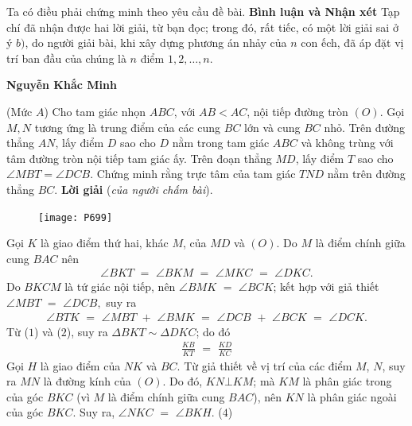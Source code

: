 \begin{multicols}{2}
	Ta có điều phải chứng minh theo yêu cầu đề bài.
	\vskip 0.05cm
	\textbf{Bình luận và Nhận xét}
	\vskip 0.05cm
	Tạp chí đã nhận được hai lời giải, từ bạn đọc; trong đó, rất tiếc, có một lời giải sai ở ý $b)$, do người giải bài, khi xây dựng phương án nhảy của $n$ con ếch, đã áp đặt vị trí ban đầu của chúng là $n$ điểm $1, 2, \ldots, n$.
	\begin{flushright}
		\textbf{Nguyễn Khắc Minh}
	\end{flushright}
	{}
	(Mức $A$) Cho tam giác nhọn $ABC$, với $AB<AC$, nội tiếp đường tròn $(O)$. Gọi $M,N$ tương ứng là trung điểm của các cung $BC$ lớn và cung $BC$ nhỏ. Trên đường thẳng $AN$, lấy điểm $D$ sao cho $D$ nằm trong tam giác $ABC$ và không trùng với tâm đường tròn nội tiếp tam giác ấy. Trên đoạn thẳng $MD$, lấy điểm $T$ sao cho $\angle{MBT}=\angle{DCB}$. Chứng minh rằng trực tâm của tam giác $TND$ nằm trên đường thẳng $BC$.
	\vskip 0.05cm
	\textbf{Lời giải} (\textit{của người chấm bài}).
	\begin{figure}[H]
		\vspace*{-5pt}
		\centering
		\captionsetup{labelformat= empty, justification=centering}
		\texttt{[image: P699]}
		\vspace*{-10pt}
	\end{figure}
	Gọi $K$ là giao điểm thứ hai, khác $M$, của $MD$ và $(O)$.
	\vskip 0.05cm
	Do $M$ là điểm chính giữa cung $BAC$ nên
	\begin{align*}
		\angle BKT\,\, = \,\,\angle BKM\,\, = \,\,\angle MKC\,\, = \,\,\angle DKC. \tag{$1$}
	\end{align*}
	Do $BKCM$ là tứ giác nội tiếp, nên $\angle BMK\,\, = \,\,\angle BCK$; kết hợp với giả thiết $\angle MBT\,\, = \,\,\angle DCB,$  suy ra
	\begin{align*}
		\angle BTK\,\, = \,\,\angle MBT\,\, + \,\,\angle BMK\,\, = \,\,\angle DCB\,\, + \,\,\angle BCK\,\, = \,\,\angle DCK. \tag{$2$}
	\end{align*}
	Từ ($1$) và ($2$), suy ra $\Delta BKT \sim  \Delta DKC$; do đó
	\begin{align*}
		\frac{{KB}}{{KT}}\,\, = \,\,\frac{{KD}}{{KC}} \tag{$3$}
	\end{align*}
	Gọi $H$ là giao điểm của $NK$ và $BC$.
	\vskip 0.05cm
	Từ giả thiết về vị trí của các điểm $M$, $N$, suy ra $MN$ là đường kính của $(O)$. Do đó, $KN \bot KM$; mà $KM$ là phân giác trong của góc $BKC$ (vì $M$ là điểm chính giữa cung $BAC$), nên $KN$ là phân giác ngoài của góc $BKC$. Suy ra, $\angle NKC\,\, = \,\,\angle BKH$. \hfill ($4$)

\end{multicols}
